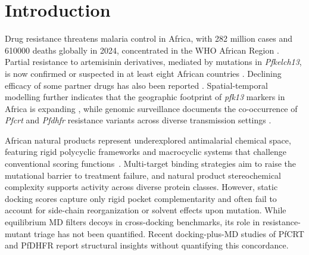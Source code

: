 \documentclass[11pt,a4paper]{article}
\begin{document}

\section{Introduction}

Drug resistance threatens malaria control in Africa, with \num{282} million cases and \num{610000} deaths globally in 2024, concentrated in the WHO African Region \citep{who_malaria_2025}. Partial resistance to artemisinin derivatives, mediated by mutations in \textit{Pfkelch13}, is now confirmed or suspected in at least eight African countries \citep{artemisinin_partial_resistance}. Declining efficacy of some partner drugs has also been reported \citep{who_malaria_2025,global_resistance_landscape_2026}. Spatial-temporal modelling further indicates that the geographic footprint of \textit{pfk13} markers in Africa is expanding \citep{young2026artemisinin}, while genomic surveillance documents the co-occurrence of \textit{Pfcrt} and \textit{Pfdhfr} resistance variants across diverse transmission settings \citep{letebo2026surveillance,africa_resistance_2026,pfk13_resistance_2026}.

African natural products represent underexplored antimalarial chemical space, featuring rigid polycyclic frameworks and macrocyclic systems that challenge conventional scoring functions~\citep{ferreira2023docking}. Multi-target binding strategies aim to raise the mutational barrier to treatment failure\citep{polypharmacology_malaria_2026}, and natural product stereochemical complexity supports activity across diverse protein classes\citep{polypharmacology_malaria_2026,value_addition_african_np_2025}. However, static docking scores capture only rigid pocket complementarity and often fail to account for side-chain reorganization or solvent effects upon mutation\citep{ferreira2023docking,soares2023mdreport}. While equilibrium MD filters decoys in cross-docking benchmarks\citep{liu2017mdfilter}, its role in resistance-mutant triage has not been quantified. Recent docking-plus-MD studies of PfCRT and PfDHFR report structural insights without quantifying this concordance\citep{ghosh2025pfcrt,gogoi2026np}.
\end{document}
